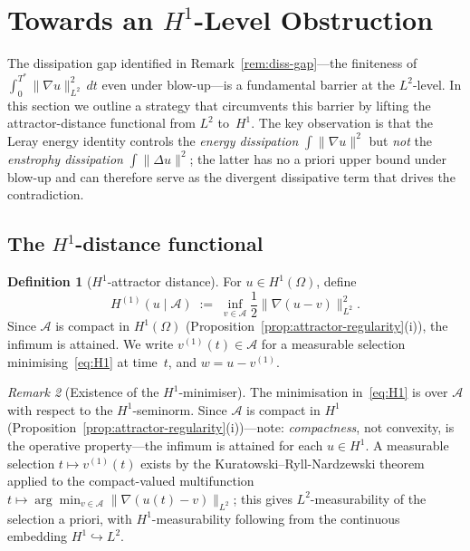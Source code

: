 \documentclass[12pt,a4paper]{article}
\theoremstyle{definition}
\newtheorem{definition}{Definition}[section]
\theoremstyle{plain}
\theoremstyle{remark}
\newtheorem{remark}[definition]{Remark}
\begin{document}
\section{Towards an $H^1$-Level Obstruction}\label{sec:H1-lift}

The dissipation gap identified in Remark~\ref{rem:diss-gap}---the
finiteness of $\int_0^{T^*}\|\nabla u\|_{L^2}^2\,dt$ even under
blow-up---is a fundamental barrier at the $L^2$-level.  In this
section we outline a strategy that circumvents this barrier by
lifting the attractor-distance functional from $L^2$ to~$H^1$.
The key observation is that the Leray energy identity controls the
\emph{energy dissipation} $\int\|\nabla u\|^2$ but \emph{not} the
\emph{enstrophy dissipation} $\int\|\Delta u\|^2$; the latter has
no a priori upper bound under blow-up and can therefore serve as the
divergent dissipative term that drives the contradiction.

\subsection{The $H^1$-distance functional}

\begin{definition}[$H^1$-attractor distance]\label{def:H1}
For $u \in H^1(\Omega)$, define
\begin{equation}\label{eq:H1}
  H^{(1)}\!(u \mid \mathcal{A})
  \;:=\;
  \inf_{v \in \mathcal{A}}
  \frac{1}{2}\|\nabla(u - v)\|_{L^2}^2.
\end{equation}
Since $\mathcal{A}$ is compact in $H^1(\Omega)$
(Proposition~\ref{prop:attractor-regularity}(i)), the infimum
is attained.  We write $v^{(1)}(t) \in \mathcal{A}$ for a
measurable selection minimising~\eqref{eq:H1} at time~$t$,
and $w = u - v^{(1)}$.
\end{definition}

\begin{remark}[Existence of the $H^1$-minimiser]
The minimisation in~\eqref{eq:H1} is over $\mathcal{A}$ with
respect to the $H^1$-seminorm.  Since $\mathcal{A}$ is compact
in $H^1$ (Proposition~\ref{prop:attractor-regularity}(i))---note:
\emph{compactness}, not convexity, is the operative
property---the infimum is attained for each $u \in H^1$.
A measurable selection $t \mapsto v^{(1)}(t)$ exists by the
Kuratowski--Ryll-Nardzewski theorem applied to the compact-valued
multifunction $t \mapsto \arg\min_{v \in \mathcal{A}}
\|\nabla(u(t)-v)\|_{L^2}$; this gives $L^2$-measurability
of the selection a priori, with $H^1$-measurability following
from the continuous embedding $H^1 \hookrightarrow L^2$.
\end{remark}
\end{document}
